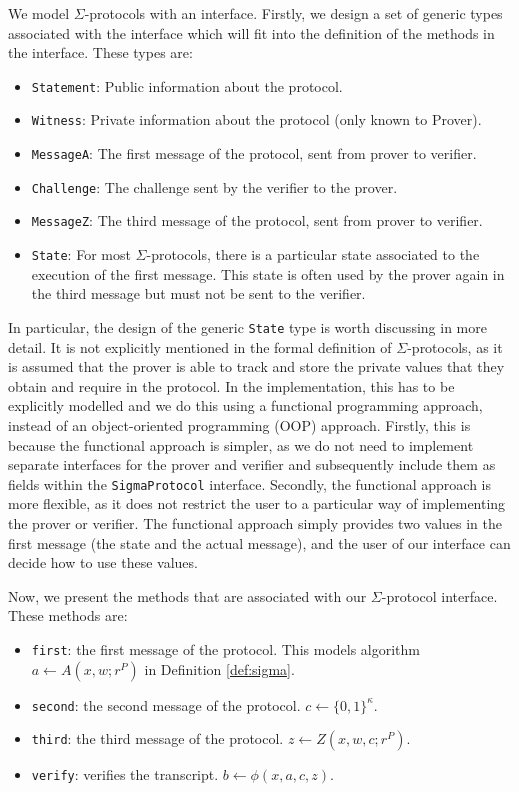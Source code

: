 We model $\Sigma$-protocols with an interface.
Firstly, we design a set of generic types associated with the interface which will fit into 
the definition of the methods in the interface. These types are:
\begin{itemize}
  \item \texttt{Statement}: Public information about the protocol.
  \item \texttt{Witness}: Private information about the protocol (only known to Prover).
  \item \texttt{MessageA}: The first message of the protocol, sent from prover to verifier.
  \item \texttt{Challenge}: The challenge sent by the verifier to the prover.
  \item \texttt{MessageZ}: The third message of the protocol, sent from prover to verifier. 
  \item \texttt{State}: For most $\Sigma$-protocols, there is a particular state associated 
  to the execution of the first message. This state is often used by the prover again in 
  the third message but must not be sent to the verifier.
\end{itemize}

In particular, the design of the generic \texttt{State} type is worth discussing in more detail.
It is not explicitly mentioned in the formal definition of $\Sigma$-protocols, as it is 
assumed that the prover is able to track and store the private values that they obtain and 
require in the protocol. In the implementation, this has to be explicitly modelled and 
we do this using a functional programming approach, instead of an object-oriented
programming (OOP) approach. 
Firstly, this is because the functional approach is simpler, as we do not need to 
implement separate interfaces for the prover and verifier and subsequently include them as fields
within the \texttt{SigmaProtocol} interface. Secondly, the functional approach is more flexible,
as it does not restrict the user to a particular way of implementing the prover or verifier.
The functional approach simply provides two values in the first message (the state and the 
actual message), and the user of our interface can decide how to use these values.

Now, we present the methods that are associated with our $\Sigma$-protocol interface. 
These methods are: 
\begin{itemize}
  \item \texttt{first}: the first message of the protocol. This models algorithm 
  $a \leftarrow A(x, w; r^P)$ 
  in Definition \ref{def:sigma}.
  \item \texttt{second}: the second message of the protocol. $c \leftarrow \{0,1\}^\kappa$.
  \item \texttt{third}: the third message of the protocol. $z \leftarrow Z(x, w, c; r^P)$. 
  \item \texttt{verify}: verifies the transcript. $b \leftarrow \phi(x, a, c, z)$.
\end{itemize}

